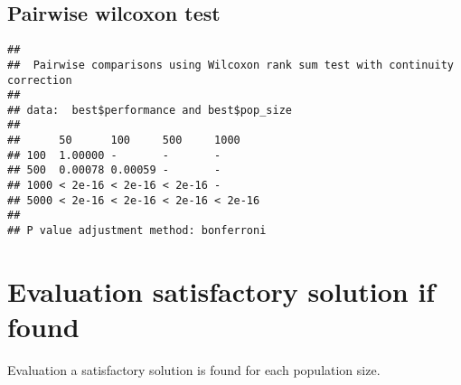 \documentclass[
]{book}
\newenvironment{Shaded}{\begin{snugshade}}{\end{snugshade}}
\newcommand{\AttributeTok}[1]{\textcolor[rgb]{0.13,0.29,0.53}{#1}}
\newcommand{\ConstantTok}[1]{\textcolor[rgb]{0.56,0.35,0.01}{#1}}
\newcommand{\FunctionTok}[1]{\textcolor[rgb]{0.13,0.29,0.53}{\textbf{#1}}}
\newcommand{\NormalTok}[1]{#1}
\newcommand{\SpecialCharTok}[1]{\textcolor[rgb]{0.81,0.36,0.00}{\textbf{#1}}}
\newcommand{\StringTok}[1]{\textcolor[rgb]{0.31,0.60,0.02}{#1}}
\begin{document}
\hypertarget{pairwise-wilcoxon-test}{%
\subsection{Pairwise wilcoxon test}\label{pairwise-wilcoxon-test}}

\begin{Shaded}
\end{Shaded}

\begin{verbatim}
## 
##  Pairwise comparisons using Wilcoxon rank sum test with continuity correction 
## 
## data:  best$performance and best$pop_size 
## 
##      50      100     500     1000   
## 100  1.00000 -       -       -      
## 500  0.00078 0.00059 -       -      
## 1000 < 2e-16 < 2e-16 < 2e-16 -      
## 5000 < 2e-16 < 2e-16 < 2e-16 < 2e-16
## 
## P value adjustment method: bonferroni
\end{verbatim}

\hypertarget{evaluation-satisfactory-solution-if-found}{%
\section{Evaluation satisfactory solution if found}\label{evaluation-satisfactory-solution-if-found}}

Evaluation a satisfactory solution is found for each population size.
\end{document}
